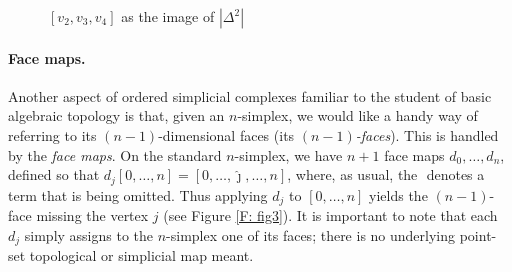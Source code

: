 \documentclass[12pt]{article}
\theoremstyle{plain}
\theoremstyle{definition}
\begin{document}
\begin{figure}[!htp]
\begin{center}
\end{center}
\caption{$[v_2,v_3,v_4]$ as the image of $|\Delta^2|$}\label{F: fig5}
\end{figure}

\paragraph{Face maps.} Another aspect of ordered simplicial complexes familiar to the student of basic algebraic topology is that, given an $n$-simplex, we would like a handy way of referring to its $(n-1)$-dimensional faces (its \emph{$(n-1)$-faces}). This is handled by the \emph{face maps}.  On the standard $n$-simplex, we have $n+1$ face maps $d_0,\ldots, d_n$, defined so that $d_j[0,\ldots, n]=[0,\ldots, \hat \jmath,\ldots, n]$, where, as usual, the $\hat{}$ denotes a term that is being omitted. Thus applying $d_j$ to $[0,\ldots, n]$ yields  the $(n-1)$-face missing the vertex $j$ (see Figure \ref{F: fig3}). It is important to note that each $d_j$ simply assigns to the $n$-simplex one of its faces;  there is no underlying point-set topological or simplicial map meant.
\end{document}
